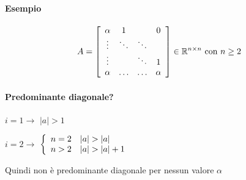 \documentclass[10pt]{book}
\begin{document}
\paragraph{Esempio} \begin{multicols}{2}
$$A = \left[\begin{array}{c c c c}
\alpha & 1 & & 0\\
\vdots & \ddots & \ddots\\
\vdots & & \ddots & 1\\
\alpha & \ldots & \ldots & \alpha
\end{array} \right] \in\mathbb{R}^{n\times n}\text{ con }n\geq 2$$
\paragraph{Predominante diagonale?}
\begin{list}{}{}
	\item[$i = 1 \rightarrow$] $|a| > 1$
	\item[$i = 2 \rightarrow$] $\left\{\begin{array}{l l}
	n = 2 & |a| > |a|\\
	n > 2 & |a| > |a| + 1
	\end{array}\right.$
\end{list}
Quindi non è predominante diagonale per nessun valore $\alpha$
\end{multicols}
\end{document}
